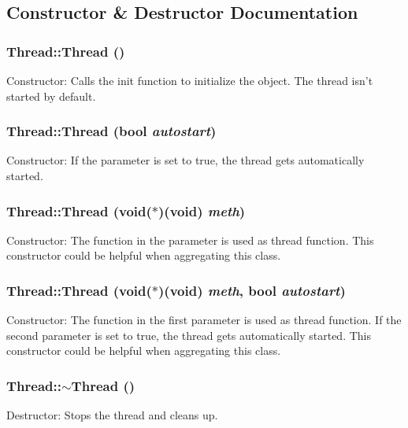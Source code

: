 \subsection{Constructor \& Destructor Documentation}
\hypertarget{classThread_a95c703fb8f2f27cb64f475a8c940864a}{
\subsubsection[{Thread}]{\setlength{\rightskip}{0pt plus 5cm}Thread::Thread ()}}
\label{classThread_a95c703fb8f2f27cb64f475a8c940864a}
Constructor: Calls the init function to initialize the object. The thread isn't started by default. \hypertarget{classThread_ac0694151493165119c7ed053361c39da}{
\subsubsection[{Thread}]{\setlength{\rightskip}{0pt plus 5cm}Thread::Thread (bool {\em autostart})}}
\label{classThread_ac0694151493165119c7ed053361c39da}
Constructor: If the parameter is set to true, the thread gets automatically started. \hypertarget{classThread_a32b9d6af7d10c905532fcfb3fa37b76e}{
\subsubsection[{Thread}]{\setlength{\rightskip}{0pt plus 5cm}Thread::Thread (void($\ast$)(void) {\em meth})}}
\label{classThread_a32b9d6af7d10c905532fcfb3fa37b76e}
Constructor: The function in the parameter is used as thread function. This constructor could be helpful when aggregating this class. \hypertarget{classThread_ad0490fe492f3a40966fd7d4a7b23c802}{
\subsubsection[{Thread}]{\setlength{\rightskip}{0pt plus 5cm}Thread::Thread (void($\ast$)(void) {\em meth}, \/  bool {\em autostart})}}
\label{classThread_ad0490fe492f3a40966fd7d4a7b23c802}
Constructor: The function in the first parameter is used as thread function. If the second parameter is set to true, the thread gets automatically started. This constructor could be helpful when aggregating this class. \hypertarget{classThread_a37d9edd3a1a776cbc27dedff949c9726}{
\subsubsection[{$\sim$Thread}]{\setlength{\rightskip}{0pt plus 5cm}Thread::$\sim$Thread ()}}
\label{classThread_a37d9edd3a1a776cbc27dedff949c9726}
Destructor: Stops the thread and cleans up. 

